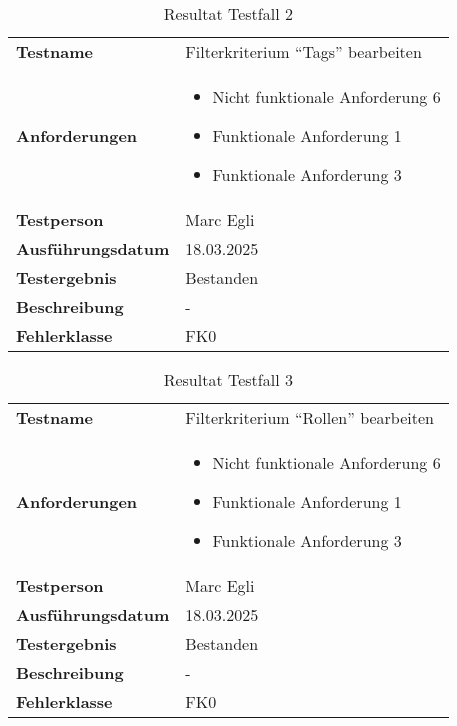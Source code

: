 \begin{table}[H]
    \begin{tabular}{|L{0.3\textwidth}|L{0.65\textwidth}|}
        \hline
           \\[10pt]
        \hline
        \textbf{Testname} & Filterkriterium ``Tags'' bearbeiten \\
        \hline
        \textbf{Anforderungen} & 
        \begin{itemize}
            \item Nicht funktionale Anforderung 6
            \item Funktionale Anforderung 1
            \item Funktionale Anforderung 3
        \end{itemize} \\
        \hline
        \textbf{Testperson} & Marc Egli \\
        \hline
        \textbf{Ausführungsdatum} & 18.03.2025 \\
        \hline
        \textbf{Testergebnis} & Bestanden \\
        \hline
        \textbf{Beschreibung} & - \\ 
        \hline
        \textbf{Fehlerklasse} & FK0 \\ 
        \hline
    \end{tabular}
    \caption{Resultat Testfall 2}
\end{table}

\begin{table}[H]
    \begin{tabular}{|L{0.3\textwidth}|L{0.65\textwidth}|}
        \hline
           \\[10pt]
        \hline
        \textbf{Testname} & Filterkriterium ``Rollen'' bearbeiten \\
        \hline
        \textbf{Anforderungen} & 
        \begin{itemize}
            \item Nicht funktionale Anforderung 6
            \item Funktionale Anforderung 1
            \item Funktionale Anforderung 3
        \end{itemize} \\
        \hline
        \textbf{Testperson} & Marc Egli \\
        \hline
        \textbf{Ausführungsdatum} & 18.03.2025 \\
        \hline
        \textbf{Testergebnis} & Bestanden \\
        \hline
        \textbf{Beschreibung} & - \\ 
        \hline
        \textbf{Fehlerklasse} & FK0 \\ 
        \hline
    \end{tabular}
    \caption{Resultat Testfall 3}
\end{table}

